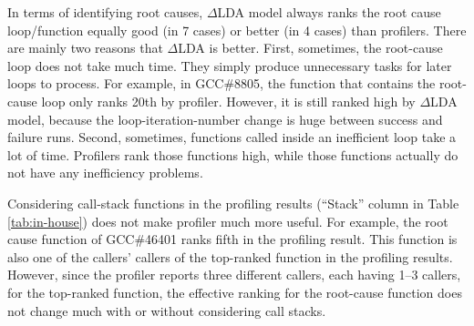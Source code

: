 In terms of identifying root causes, $\Delta$LDA model always ranks the
root cause loop/function equally good (in 7 cases) 
or better (in 4 cases) than profilers. There are mainly two reasons that 
$\Delta$LDA is better. First, sometimes, the root-cause loop does not take
much time. They simply produce unnecessary tasks for later loops to process.
For example, in GCC\#8805, the function that contains the root-cause loop
only ranks 20th by profiler. However, it is still ranked high by $\Delta$LDA
model, because the loop-iteration-number change is huge between
success and failure runs. Second, sometimes, functions
called inside an inefficient loop take a lot of time. 
Profilers rank those functions high, while those functions actually do not
have any inefficiency problems.

Considering call-stack functions in the profiling results (``Stack'' column
in Table \ref{tab:in-house}) does not make profiler much more useful.
For example, the root cause function of GCC\#46401 ranks fifth in
the profiling result. This function is also one of the callers' callers of the
top-ranked function in the profiling results. However, since the profiler
reports three different callers, each having 1--3 callers,
for the top-ranked function, the effective ranking
for the root-cause function does not change much with or without considering
call stacks.
